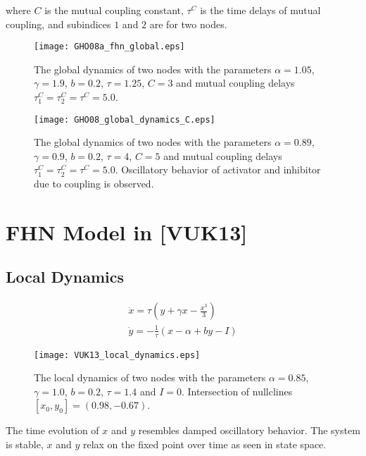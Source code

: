 \documentclass[12pt]{article}
\begin{document}
where $C$ is the mutual coupling constant, $\tau^C$ is the time delays of mutual coupling, and subindices $1$ and $2$ are for two nodes. 


\begin{figure}[h!]
	\centering
	\texttt{[image: GHO08a\_fhn\_global.eps]}
		\caption{The global dynamics of two nodes with the parameters $\alpha = 1.05$, $\gamma=1.9$, $b=0.2$, $\tau = 1.25$, $C=3$ and mutual coupling delays $\tau_1^C=\tau_2^C=\tau^C=5.0$.}
\end{figure}

\begin{figure}[h!]
	\centering
	\texttt{[image: GHO08\_global\_dynamics\_C.eps]}
		\caption{The global dynamics of two nodes with the parameters $\alpha = 0.89$, $\gamma=0.9$, $b=0.2$, $\tau = 4$, $C=5$ and mutual coupling delays $\tau_1^C=\tau_2^C=\tau^C=5.0$. Oscillatory behavior of activator and inhibitor due to coupling is observed.}
\end{figure}

\newpage

\section{FHN Model in [VUK13]} 

\subsection{Local Dynamics}
\begin{subequations}
 \begin{align}\dot{x} = \tau (y + \gamma x - \frac{x^3}{3})  \label{eqn: frobenius 17}\\  \dot{y} = -\frac{1}{\tau} (x - \alpha + b y - I ) \label{eqn: frobenius 18}   \end{align} 
\end{subequations}

\begin{figure}[h!]
	\centering
	\texttt{[image: VUK13\_local\_dynamics.eps]}
		\caption{The local dynamics of two nodes with the parameters $\alpha = 0.85$, $\gamma=1.0$, $b=0.2$, $\tau = 1.4$ and $I=0$. Intersection of nullclines $[x_0, y_0] = (0.98,  -0.67)$. }
\end{figure}

The time evolution of $x$ and $y$ resembles damped oscillatory behavior. The system is stable, $x$ and $y$ relax on the fixed point over time as seen in state space.
\end{document}
